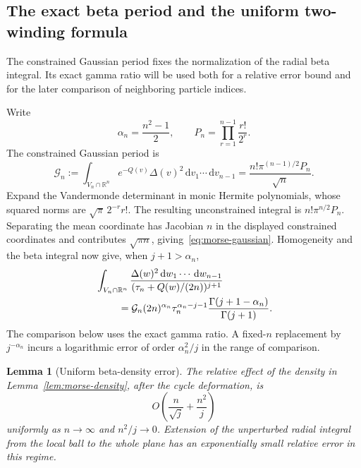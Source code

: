 \documentclass[11pt]{article}
\numberwithin{equation}{section}
\newtheorem{lemma}[theorem]{Lemma}
\theoremstyle{definition}
\newcommand{\R}{\mathbb R}
\newcommand{\dd}{\,\mathrm d}
\begin{document}
\subsection{The exact beta period and the uniform two-winding formula}

The constrained Gaussian period fixes the normalization of the radial
beta integral. Its exact gamma ratio will be used both for a relative
error bound and for the later comparison of neighboring particle indices.

Write
\begin{equation}
 \alpha_n=\frac{n^2-1}{2},\qquad
 P_n=\prod_{r=1}^{n-1}\frac{r!}{2^r}.
 \label{eq:morse-alpha-P}
\end{equation}
The constrained Gaussian period is
\begin{equation}
 \mathcal G_n:=\int_{V_n\cap\R^n}e^{-Q(v)}\Delta(v)^2
                   \dd v_1\cdots\dd v_{n-1}
 =\frac{n!\pi^{(n-1)/2}P_n}{\sqrt n}.
 \label{eq:morse-gaussian}
\end{equation}
Expand the Vandermonde determinant in monic
Hermite polynomials, whose squared norms are
$\sqrt\pi\,2^{-r}r!$.  The resulting unconstrained integral is
$n!\pi^{n/2}P_n$.  Separating the mean coordinate has Jacobian $n$
in the displayed constrained coordinates and contributes
$\sqrt{\pi n}$, giving~\eqref{eq:morse-gaussian}.
Homogeneity and the beta integral now give, when $j+1>\alpha_n$,
\begin{align}
 &\int_{V_n\cap\R^n}
 \frac{\Delta(w)^2\dd w_1\cdots\dd w_{n-1}}
 {(\tau_n+Q(w)/(2n))^{j+1}}\notag\\
 &\hspace{8mm}=
 \mathcal G_n(2n)^{\alpha_n}\tau_n^{\alpha_n-j-1}
 \frac{\Gamma(j+1-\alpha_n)}{\Gamma(j+1)}.
 \label{eq:morse-beta-period}
\end{align}
The comparison below uses the exact gamma ratio. A fixed-$n$
replacement by $j^{-\alpha_n}$ incurs a logarithmic error of order
$\alpha_n^2/j$ in the range of comparison.

\begin{lemma}[Uniform beta-density error]
\label{lem:negative-beta-uniform}
The relative effect of the density in
Lemma~\ref{lem:morse-density}, after the cycle deformation, is
\begin{equation}
 O\left(\frac n{\sqrt j}+\frac{n^2}{j}\right)
 \label{eq:morse-beta-relative-error}
\end{equation}
uniformly as $n\to\infty$ and $n^2/j\to0$.  Extension of the
unperturbed radial integral from the local ball to the whole plane
has an exponentially small relative error in this regime.
\end{lemma}
\end{document}
